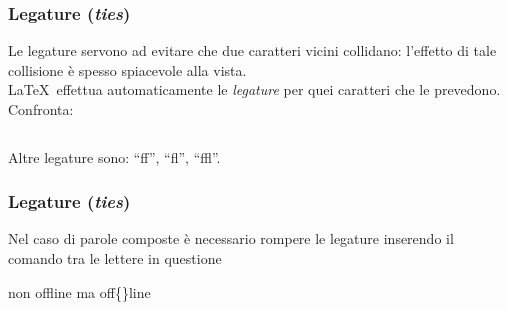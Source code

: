 \documentclass[svgnames,%
	ucs,%
	pdftex]{guitbeamer}
\begin{document}
\begin{frame}
  \frametitle{Legature (\textit{ties})}
	Le legature servono ad evitare che due caratteri vicini collidano:
	l'effetto di tale collisione \`e spesso spiacevole alla vista.\\
	\LaTeX\ effettua automaticamente le \emph{legature} per quei
	caratteri che le prevedono. Confronta:
	\begin{columns}
		\begin{LaTeXoutput}\centering
		\end{LaTeXoutput}
		\begin{LaTeXoutput}\centering
		\end{LaTeXoutput}
	\end{columns}
  \bigskip
	Altre legature sono: ``ff'', ``fl'', ``ffl''.\\
\end{frame}
\begin{frame}
  \frametitle{Legature (\textit{ties})}
		Nel caso di parole composte \`e necessario rompere le legature inserendo il comando \LCmd[]{\{\}} tra le lettere in questione
	\begin{LaTeXcode}
		non offline ma off\alert{\{\}}line
	\end{LaTeXcode}
	\begin{LaTeXoutput}
	\end{LaTeXoutput}
\end{frame}
\end{document}
